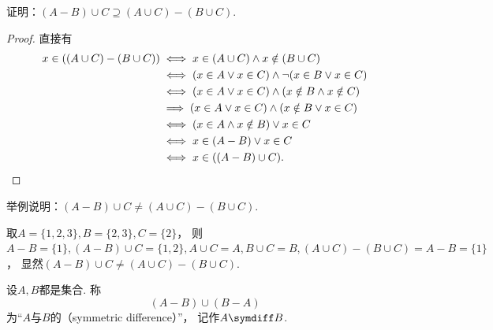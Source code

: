 \begin{example}
证明：\((A - B) \cup C \supseteq (A \cup C) - (B \cup C)\).
\begin{proof}
直接有\begin{align*}
	x \in ((A \cup C) - (B \cup C))
	&\iff
	x \in (A \cup C)
	\land
	x \notin (B \cup C) \\
	&\iff
	(
		x \in A
		\lor
		x \in C
	)
	\land
	\neg(
		x \in B
		\lor
		x \in C
	) \\
	&\iff
	(
		x \in A
		\lor
		x \in C
	)
	\land
	(
		x \notin B
		\land
		x \notin C
	) \\
	&\implies
	(
		x \in A
		\lor
		x \in C
	)
	\land
	(
		x \notin B
		\lor
		x \in C
	) \\
	&\iff
	(
		x \in A
		\land
		x \notin B
	)
	\lor
	x \in C \\
	&\iff
	x \in (A - B)
	\lor
	x \in C \\
	&\iff
	x \in ((A - B) \cup C).
	\qedhere
\end{align*}
\end{proof}
\end{example}

\begin{example}
举例说明：\((A - B) \cup C \neq (A \cup C) - (B \cup C)\).
\begin{solution}
取\(A = \{1,2,3\},
B = \{2,3\},
C = \{2\}\)，
则\(A - B = \{1\},
(A - B) \cup C = \{1,2\},
A \cup C = A,				\allowbreak
B \cup C = B,
(A \cup C) - (B \cup C)
= A - B = \{1\}\)，
显然\((A - B) \cup C \neq (A \cup C) - (B \cup C)\).
\end{solution}
\end{example}

\begin{definition}
设\(A,B\)都是集合.
称\begin{equation*}
	(A-B)\cup(B-A)
\end{equation*}为“\(A\)与\(B\)的（symmetric difference）”，
记作\(A \symdiff B\).
\end{definition}


